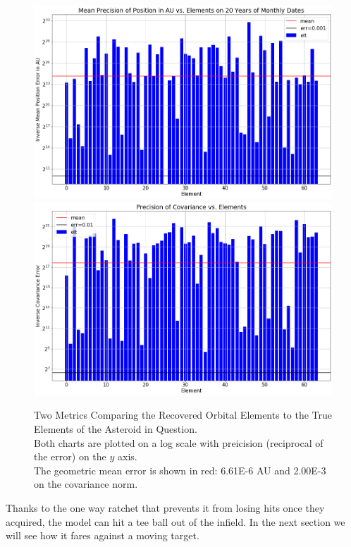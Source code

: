 \begin{figure}[h]
\begin{center}
\includegraphics[width=1.0\textwidth]{../figs/search_known/unperturbed/near_ast_dist.png}
\includegraphics[width=1.0\textwidth]{../figs/search_known/unperturbed/near_ast_cov.png}
\end{center}
\caption[Two Metrics Comparing the Recovered Orbital Elements to True Elements]
{Two Metrics Comparing the Recovered Orbital Elements to the True Elements of the Asteroid in Question.\\
Both charts are plotted on a log scale with preicision (reciprocal of the error) on the $y$ axis.\\
The geometric mean error is shown in red: 6.61E-6 AU and 2.00E-3 on the covariance norm.}
\label{fig:UnperturbedNearAst}
\end{figure}
Thanks to the one way ratchet that prevents it from losing hits once they acquired, 
the model can hit a tee ball out of the infield.
In the next section we will see how it fares against a moving target.

